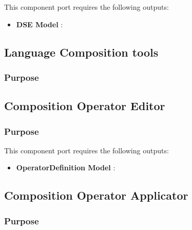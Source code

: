 \documentclass{gemoc} %
\begin{document}
This component port requires the following outputs:
\begin{itemize}
  \item \textbf{DSE Model} :
\end{itemize}

\subsection{Language Composition tools}


\subsubsection{Purpose}



\subsection{Composition Operator Editor}


\subsubsection{Purpose}


This component port requires the following outputs:
\begin{itemize}
  \item \textbf{OperatorDefinition Model} :
\end{itemize}

\subsection{Composition Operator Applicator}


\subsubsection{Purpose}
\end{document}
